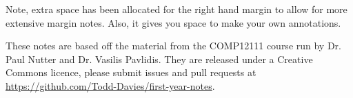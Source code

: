 \documentclass{article}
\author{\Author}
\title{\Title}
\begin{document}
\chead{}


\maketitle

{\small Note, extra space has been allocated for the right hand margin to allow
for more extensive margin notes. Also, it gives you space to make your own
annotations.}

{\small These notes are based off the material from the COMP12111 course run by 
Dr. Paul Nutter and Dr. Vasilis Pavlidis. They are released
under a Creative Commons licence, please submit issues and pull requests at
\url{https://github.com/Todd-Davies/first-year-notes}.}

\thispagestyle{empty}
\tableofcontents
\thispagestyle{empty}
\newpage


\end{document}
